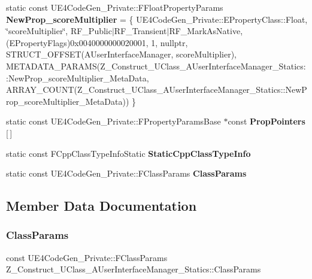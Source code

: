 \begin{DoxyCompactItemize}
static const U\+E4\+Code\+Gen\+\_\+\+Private\+::\+F\+Float\+Property\+Params {\bfseries New\+Prop\+\_\+score\+Multiplier} = \{ U\+E4\+Code\+Gen\+\_\+\+Private\+::\+E\+Property\+Class\+::\+Float, \char`\"{}score\+Multiplier\char`\"{}, R\+F\+\_\+\+Public$\vert$R\+F\+\_\+\+Transient$\vert$R\+F\+\_\+\+Mark\+As\+Native, (E\+Property\+Flags)0x0040000000020001, 1, nullptr, S\+T\+R\+U\+C\+T\+\_\+\+O\+F\+F\+S\+E\+T(\+A\+User\+Interface\+Manager, score\+Multiplier), M\+E\+T\+A\+D\+A\+T\+A\+\_\+\+P\+A\+R\+A\+M\+S(\+Z\+\_\+\+Construct\+\_\+\+U\+Class\+\_\+\+A\+User\+Interface\+Manager\+\_\+\+Statics\+::\+New\+Prop\+\_\+score\+Multiplier\+\_\+\+Meta\+Data, A\+R\+R\+A\+Y\+\_\+\+C\+O\+U\+N\+T(\+Z\+\_\+\+Construct\+\_\+\+U\+Class\+\_\+\+A\+User\+Interface\+Manager\+\_\+\+Statics\+::\+New\+Prop\+\_\+score\+Multiplier\+\_\+\+Meta\+Data)) \}
\item 
static const U\+E4\+Code\+Gen\+\_\+\+Private\+::\+F\+Property\+Params\+Base $\ast$const {\bfseries Prop\+Pointers} \mbox{[}$\,$\mbox{]}
\item 
static const F\+Cpp\+Class\+Type\+Info\+Static {\bfseries Static\+Cpp\+Class\+Type\+Info}
\item 
static const U\+E4\+Code\+Gen\+\_\+\+Private\+::\+F\+Class\+Params {\bfseries Class\+Params}
\end{DoxyCompactItemize}


\subsection{Member Data Documentation}
\mbox{\label{struct_z___construct___u_class___a_user_interface_manager___statics_acf33a55d90020d79b4503e0594bfc3d4}} 
\subsubsection{\texorpdfstring{ClassParams}{ClassParams}}
{\footnotesize\ttfamily const U\+E4\+Code\+Gen\+\_\+\+Private\+::\+F\+Class\+Params Z\+\_\+\+Construct\+\_\+\+U\+Class\+\_\+\+A\+User\+Interface\+Manager\+\_\+\+Statics\+::\+Class\+Params\hspace{0.3cm}{\ttfamily [static]}}

